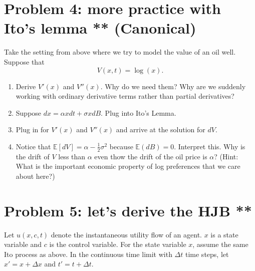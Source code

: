 \documentclass[11pt]{extarticle}
\theoremstyle{plain}
\theoremstyle{definition}
\begin{document}
\section*{Problem 4: more practice with Ito's lemma ** (Canonical)}

Take the setting from above where we try to model the value of an oil well. Suppose that 
\begin{equation*}
	V(x, t) = \log(x).
\end{equation*}

\begin{enumerate}
\item Derive $V'(x)$ and $V''(x)$. Why do we need them? Why are we suddenly working with ordinary derivative terms rather than partial derivatives? 

\item Suppose $dx = \alpha x dt + \sigma x dB$. Plug into Ito's Lemma.

\item Plug in for $V'(x)$ and $V''(x)$ and arrive at the solution for $dV$. 

\item Notice that $\mathbb E[ dV ] = \alpha - \frac{1}{2} \sigma^2$ because $\mathbb E (dB) = 0$. Interpret this. Why is the drift of $V$ less than $\alpha$ even thow the drift of the oil price is $\alpha$? (Hint: What is the important economic property of log preferences that we care about here?)

\end{enumerate}





\vspace{10mm}
\section*{Problem 5: let's derive the HJB **}

Let $u(x, c, t)$ denote the instantaneous utility flow of an agent. $x$ is a state variable and $c$ is the control variable. For the state variable $x$, assume the same Ito process as above. In the continuous time limit with $\Delta t$ time steps, let $x' = x + \Delta x$ and $t' = t + \Delta t$.
\end{document}
